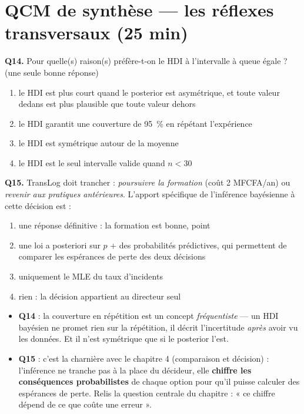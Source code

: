 \documentclass[11pt,a4paper]{article}
\begin{document}
\section{QCM de synthèse --- les réflexes transversaux (25 min)}

\begin{qcmbox}[Questions 14 et 15]
\textbf{Q14.} Pour quelle(s) raison(s) préfère-t-on le HDI à l'intervalle à
queue égale ? (une seule bonne réponse)
\begin{enumerate}[label=\Alph*.), leftmargin=8mm, itemsep=0.3mm]
  \item le HDI est plus court quand le posterior est asymétrique, et toute
        valeur dedans est plus plausible que toute valeur dehors
  \item le HDI garantit une couverture de 95~\% en répétant l'expérience
  \item le HDI est symétrique autour de la moyenne
  \item le HDI est le seul intervalle valide quand $n < 30$
\end{enumerate}

\vspace{2mm}
\textbf{Q15.} TransLog doit trancher : \emph{poursuivre la formation}
(coût 2 MFCFA/an) ou \emph{revenir aux pratiques antérieures}. L'apport
spécifique de l'inférence bayésienne à cette décision est :
\begin{enumerate}[label=\Alph*.), leftmargin=8mm, itemsep=0.3mm]
  \item une réponse définitive : la formation est bonne, point
  \item une loi a posteriori sur $p$ + des probabilités prédictives, qui
        permettent de comparer les espérances de perte des deux décisions
  \item uniquement le MLE du taux d'incidents
  \item rien : la décision appartient au directeur seul
\end{enumerate}
\end{qcmbox}

\begin{piege}[Questions 14 et 15]
\begin{itemize}[leftmargin=4mm, itemsep=0.5mm]
  \item \textbf{Q14} : la couverture en répétition est un concept
        \emph{fréquentiste} --- un HDI bayésien ne promet rien sur la
        répétition, il décrit l'incertitude \emph{après} avoir vu les données.
        Et il n'est symétrique que si le posterior l'est.
  \item \textbf{Q15} : c'est la charnière avec le chapitre 4 (comparaison et
        décision) : l'inférence ne tranche pas à la place du décideur, elle
        \textbf{chiffre les conséquences probabilistes} de chaque option pour
        qu'il puisse calculer des espérances de perte. Relis la question
        centrale du chapitre : « ce chiffre dépend de ce que coûte une erreur ».
\end{itemize}
\end{piege}
\end{document}
